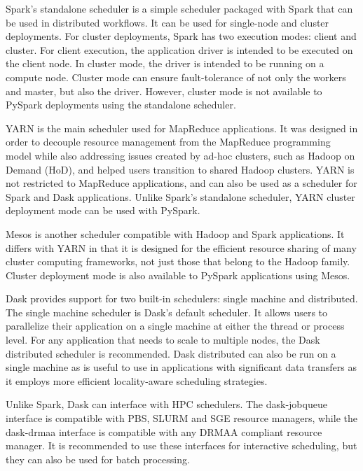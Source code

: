             Spark's standalone scheduler is a simple scheduler packaged with
            Spark that can be used in distributed workflows. It can be used for
            single-node and cluster deployments. For cluster deployments, Spark
            has two execution modes: client and cluster. For client execution,
            the application driver is intended to be executed on the client
            node. In cluster mode, the driver is intended to be running
            on a compute node. Cluster mode can ensure fault-tolerance of not
            only the workers and master, but also the driver. However, cluster
            mode is not available to PySpark deployments using the standalone
            scheduler.

            YARN is the main scheduler used for MapReduce applications. It was
            designed in order to decouple resource management from the MapReduce
            programming model while also addressing issues created by ad-hoc
            clusters, such as Hadoop on Demand (HoD), and helped users
            transition to shared Hadoop clusters. YARN is not restricted to
            MapReduce applications, and can also be used as a scheduler for
            Spark and Dask applications. Unlike Spark's standalone scheduler,
            YARN cluster deployment mode can be used with PySpark.
            
            Mesos is another scheduler compatible with Hadoop and Spark
            applications. It differs with YARN in that it is designed for the
            efficient resource sharing of many cluster computing frameworks, not
            just those that belong to the Hadoop family. Cluster deployment mode
            is also available to PySpark applications using Mesos. 
            
            Dask provides support for two built-in schedulers: single machine
            and distributed. The single machine scheduler is Dask's default
            scheduler. It allows users to parallelize their application on a
            single machine at either the thread or process level. For any
            application that needs to scale to multiple nodes, the Dask
            distributed scheduler is recommended. Dask distributed can also be
            run on a single machine as is useful to use in applications with
            significant data transfers as it employs more efficient
            locality-aware scheduling strategies. 

            Unlike Spark, Dask can interface with HPC schedulers. The
            dask-jobqueue interface is compatible with PBS, SLURM and SGE
            resource managers, while the dask-drmaa interface is compatible with
            any DRMAA compliant resource manager. It is recommended to use these
            interfaces for interactive scheduling, but they can also be used for
            batch processing.

